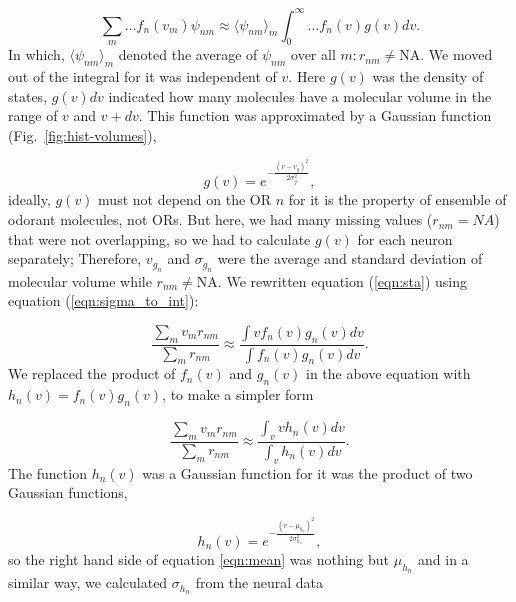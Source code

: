 \documentclass[11pt]{paper} %
\begin{document}
\begin{equation}
	\sum_{m} \dots f_n(v_m) \psi_{nm} \approx  \langle \psi_{nm} \rangle_m \int_0^\infty \dots f_n(v) g(v)  dv. 
	\label{eqn:sigma_to_int}
\end{equation}
In which, 
$\langle \psi_{nm} \rangle_m$ denoted the average of $\psi_{nm}$ over all $m: r_{nm} \neq \text{NA}$. 
We moved out of the integral for it was independent of $v$.
Here $g(v)$ was the density of states, $g(v) dv$ indicated how many molecules have a molecular volume in the range of $v$ and $v+dv$.
This function was approximated by a Gaussian function (Fig.~\ref{fig:hist-volumes}), 

\begin{equation}
	g(v) = e^{-\frac{(v- v_{g})^2}{2 \sigma_{g}^2}},
	\label{eqn:hist-volumes}
\end{equation}
ideally, $g(v)$ must not depend on the OR $n$ for it is the property of ensemble of odorant molecules, not ORs. 
But here, we had many missing values ($r_{nm} = NA$) that were not overlapping, 
so we had to calculate $g(v)$ for each neuron separately; 
Therefore, $v_{g_n}$ and $\sigma_{g_n}$ were the average and standard deviation of molecular volume while $r_{nm} \neq \text{NA}$.
We rewritten equation (\ref{eqn:sta}) using equation (\ref{eqn:sigma_to_int}):

\begin{equation}
	\frac{\displaystyle \sum_{m} v_m r_{nm}}{\displaystyle \sum_{m} r_{nm}} \approx \frac{\displaystyle \int v f_n(v) g_n(v) dv}{\displaystyle \int f_n(v) g_n(v) dv}.
	\label{eqn:sta_int}
\end{equation}
We replaced the product of $f_n(v)$ and $g_n(v)$ in the above equation with $h_n(v) = f_n(v) g_n(v)$, to make a simpler form

\begin{equation}
	\frac{\displaystyle \sum_{m} v_m r_{nm}}{\displaystyle \sum_{m} r_{nm}} \approx \frac{\displaystyle \int_v v h_n(v) dv}{ \displaystyle \int_v  h_n(v) dv }.
	\label{eqn:mean}
\end{equation}
The function $h_n(v)$ was a Gaussian function for it was the product of two Gaussian functions, 

\begin{equation}
h_n(v) = e^{-\frac{(v-\mu_{h_n})^2}{2\sigma_{h_n}^2}}, 
\end{equation}
so the right hand side of equation \ref{eqn:mean} was nothing but $\mu_{h_n}$ and 
in a similar way, we calculated $\sigma_{h_n}$ from the neural data
\end{document}
